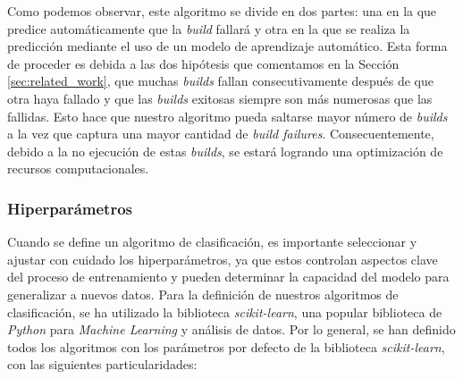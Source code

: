 Como podemos observar, este algoritmo se divide en dos partes: una en la que predice
automáticamente que la \textit{build} fallará y otra en la que se realiza la predicción mediante
el uso de un modelo de aprendizaje automático. Esta forma de proceder es debida a las dos
hipótesis que comentamos en la Sección \ref{sec:related_work}, que muchas \textit{builds} fallan
consecutivamente después de que otra haya fallado y que las \textit{builds} exitosas siempre son
más numerosas que las fallidas. Esto hace que nuestro algoritmo pueda saltarse mayor número de
\textit{builds} a la vez que captura una mayor cantidad de \textit{build failures}.
Consecuentemente, debido a la no ejecución de estas \textit{builds}, se estará logrando una
optimización de recursos computacionales.

\subsubsection{Hiperparámetros}
Cuando se define un algoritmo de clasificación, es importante seleccionar y ajustar con cuidado
los hiperparámetros, ya que estos controlan aspectos clave del proceso de entrenamiento y pueden
determinar la capacidad del modelo para generalizar a nuevos datos. Para la definición de nuestros
algoritmos de clasificación, se ha utilizado la biblioteca \textit{scikit-learn}, una popular
biblioteca de \textit{Python} para \textit{Machine Learning} y análisis de datos. Por lo general,
se han definido todos los algoritmos con los parámetros por defecto de la biblioteca
\textit{scikit-learn}, con las siguientes particularidades:

